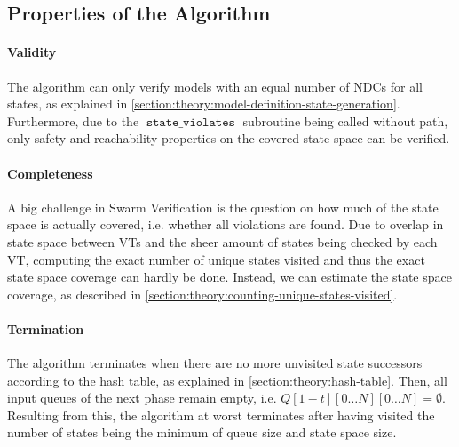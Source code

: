 \documentclass[
fancyheadings, %
%
%
]{stsreprt}
\DeclareMathOperator{\sViolates}{\texttt{state\_violates}}
\begin{document}

\subsection{Properties of the Algorithm}
\label{section:theory:grapple-properties}

\paragraph{Validity}
The algorithm can only verify models with an equal number of NDCs for all states, as explained in \cref{section:theory:model-definition-state-generation}.
Furthermore, due to the $\sViolates$ subroutine being called without path, only safety and reachability properties on the covered state space can be verified.


\paragraph{Completeness}
A big challenge in Swarm Verification is the question on how much of the state space is actually covered, i.e. whether all violations are found.
Due to overlap in state space between VTs and the sheer amount of states being checked by each VT, computing the exact number of unique states visited and thus the exact state space coverage can hardly be done.
Instead, we can estimate the state space coverage, as described in \cref{section:theory:counting-unique-states-visited}.

\paragraph{Termination}
The algorithm terminates when there are no more unvisited state successors according to the hash table, as explained in \cref{section:theory:hash-table}.
Then, all input queues of the next phase remain empty, i.e. $Q\left[1 - t\right]\left[0 \dots N\right]\left[0 \dots N\right] = \emptyset$.
Resulting from this, the algorithm at worst terminates after having visited the number of states being the minimum of queue size and state space size.
\end{document}

